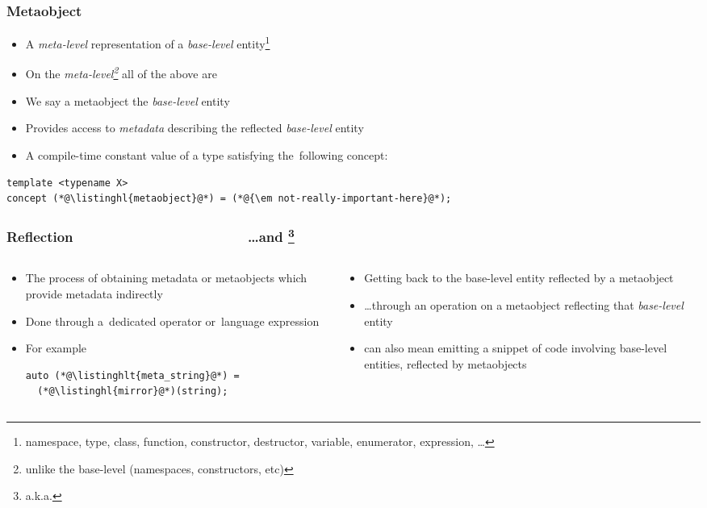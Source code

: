 \documentclass[compress,table,xcolor=table]{beamer}
\begin{document}
\begin{frame}[fragile]
  \frametitle{Metaobject}
  \begin{itemize}
    \item A {\em meta-level} representation of a {\em base-level} entity\footnote{
      namespace, type, class, function, constructor, destructor, variable,
        enumerator, expression, \ldots}
    \item On the {\em meta-level\footnote{unlike the base-level (namespaces,
      constructors, etc)}} all of the above are 
    \item We say a metaobject  the {\em base-level} entity
    \item Provides access to {\em metadata} describing the reflected
      {\em base-level} entity
    \item A compile-time constant
    {\larger value} of a type satisfying the~following concept:
  \end{itemize}
  \begin{lstlisting}[language=c++2x]
template <typename X>
concept (*@\listinghl{metaobject}@*) = (*@{\em not-really-important-here}@*);
  \end{lstlisting}
\end{frame}
\begin{frame}[fragile]
  \frametitle{Reflection~~~~~~~~~~~~~~~~~~~~~~~\ldots and
  \footnote{a.k.a. }}
  \begin{columns}
    \begin{column}{.50\textwidth}
      \begin{itemize}
        \item The process of obtaining metadata or metaobjects which provide metadata
          indirectly
        \item Done through a~dedicated operator or~language expression
        \item For example
  \begin{lstlisting}[language=c++2x,basicstyle=\footnotesize\ttfamily]
auto (*@\listinghlt{meta_string}@*) =
  (*@\listinghl{mirror}@*)(string);
  \end{lstlisting}
      \end{itemize}
    \end{column}
    \begin{column}{.50\textwidth}
      \begin{itemize}
        \item Getting back to the base-level entity reflected by a metaobject
        \item \ldots through an operation on a metaobject reflecting that
          {\em base-level} entity
        \item {} can also mean emitting a snippet of code involving
          base-level entities, reflected by metaobjects
      \end{itemize}
    \end{column}
  \end{columns}
\end{frame}
\end{document}
